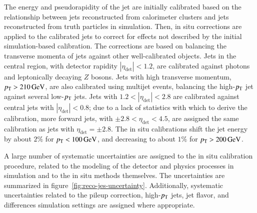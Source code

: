 The energy and pseudorapidity of the jet are initially calibrated based on the relationship between jets reconstructed from calorimeter clusters and jets reconstructed from truth particles in simulation. Then, in situ corrections are applied to the calibrated jets to correct for effects not described by the initial simulation-based calibration. The corrections are based on balancing the transverse momenta of jets against other well-calibrated objects. Jets in the central region, with detector rapidity $|\eta_{\mathrm{det}}|<1.2$, are calibrated against photons and leptonically decaying $Z$ bosons. Jets with high transverse momentum, $p_{\text{T}}>\SI{210}{\giga\electronvolt}$, are also calibrated using multijet events, balancing the high-$p_{\text{T}}$ jet against several low-$p_{\text{T}}$ jets. Jets with $1.2<|\eta_{\mathrm{det}}|<2.8$ are calibrated against central jets with $|\eta_{\mathrm{det}}|<0.8$; due to a lack of statistics with which to derive the calibration, more forward jets, with $\pm2.8<\eta_{\mathrm{det}}<4.5$, are assigned the same calibration as jets with $\eta_{\mathrm{det}}=\pm2.8$. The in situ calibrations shift the jet energy by about $2\%$ for $p_{\text{T}}<\SI{100}{\giga\electronvolt}$, and decreasing to about $1\%$ for $p_{\text{T}}>\SI{200}{\giga\electronvolt}$. 

A large number of systematic uncertainties are assigned to the in situ calibration procedure, related to the modeling of the detector and physics processes in simulation and to the in situ methods themselves. The uncertainties are summarized in figure~\ref{fig:reco-jes-uncertainty}. Additionally, systematic uncertainties related to the pileup correction, high-$p_{\text{T}}$ jets, jet flavor, and differences simulation settings are assigned where appropriate.

